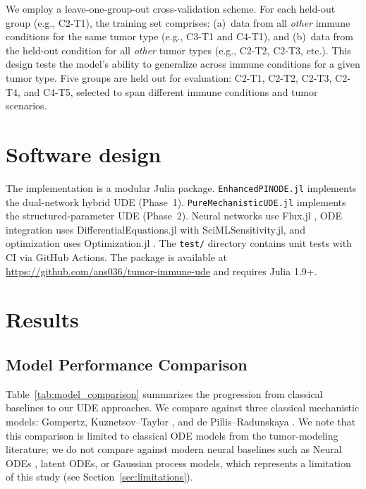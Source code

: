 \documentclass{juliacon}
\begin{document}
We employ a leave-one-group-out cross-validation scheme. For each held-out group (e.g., C2-T1), the training set comprises: (a)~data from all \emph{other} immune conditions for the same tumor type (e.g., C3-T1 and C4-T1), and (b)~data from the held-out condition for all \emph{other} tumor types (e.g., C2-T2, C2-T3, etc.). This design tests the model's ability to generalize across immune conditions for a given tumor type. Five groups are held out for evaluation: C2-T1, C2-T2, C2-T3, C2-T4, and C4-T5, selected to span different immune conditions and tumor scenarios.

\section{Software design}
\label{sec:software-design}

The implementation is a modular Julia package. \texttt{EnhancedPINODE.jl} implements the dual-network hybrid UDE (Phase~1). \texttt{PureMechanisticUDE.jl} implements the structured-parameter UDE (Phase~2). Neural networks use Flux.jl \cite{innes2018flux}, ODE integration uses DifferentialEquations.jl \cite{rackauckas2017de} with SciMLSensitivity.jl, and optimization uses Optimization.jl \cite{rackauckas2019diffeqflux}. The \texttt{test/} directory contains unit tests with CI via GitHub Actions. The package is available at \url{https://github.com/ans036/tumor-immune-ude} and requires Julia 1.9+.

\section{Results}
\label{sec:results}

\subsection{Model Performance Comparison}

Table~\ref{tab:model_comparison} summarizes the progression from classical baselines to our UDE approaches. We compare against three classical mechanistic models: Gompertz, Kuznetsov--Taylor \cite{kuznetsov1994}, and de Pillis--Radunskaya \cite{depillis2005validated}. We note that this comparison is limited to classical ODE models from the tumor-modeling literature; we do not compare against modern neural baselines such as Neural ODEs \cite{chen2018node}, latent ODEs, or Gaussian process models, which represents a limitation of this study (see Section~\ref{sec:limitations}).
\end{document}

